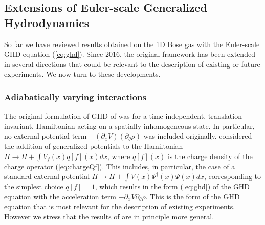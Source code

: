 \documentclass[onecolumn,amsfonts,showpacs,superscriptaddress]{revtex4-1}
\begin{document}
\subsection{Extensions of Euler-scale Generalized Hydrodynamics}

So far we have reviewed results obtained on the 1D Bose gas with the Euler-scale GHD equation (\ref{eq:ghd}). Since 2016, the original framework has been extended in several directions that could be relevant to the description of existing or future experiments. We now turn to these developments. 




\subsubsection{Adiabatically varying interactions}

The original formulation of GHD of \citep{castro2016emergent,bertini2016transport} was for a time-independent, translation invariant, Hamiltonian acting on a spatially inhomogeneous state. In particular, no external potential term $-(\partial_x V) (\partial_\theta \rho)$ was  included originally. \cite{doyon2017note} considered the addition of generalized potentials to the Hamiltonian $H \rightarrow H+ \int V_f(x) q[f](x) dx$, where $q[f](x)$ is the charge density of the charge operator (\ref{eq:chargeQf}). This includes, in particular, the case of a standard external potential $H \rightarrow H+ \int V(x) \Psi^\dagger(x) \Psi(x) dx$, corresponding to the simplest choice $q[f]=1$, which results in the form (\ref{eq:ghd}) of the GHD equation with the acceleration term $-\partial_x V \partial_\theta \rho$. This is the form of the GHD equation that is most relevant for the description of existing experiments. However we stress that the results of \citep{doyon2017note} are in principle more general.
\end{document}
